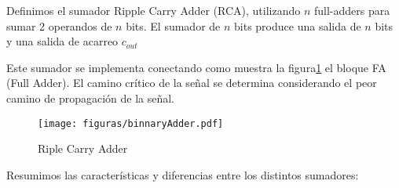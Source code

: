Definimos el sumador Ripple Carry Adder (RCA), utilizando \(n\) full-adders para sumar 2 operandos de \(n\) bits. El sumador de \(n\) bits produce una salida de \(n\) bits y una salida de acarreo \(c_{out}\)

Este sumador se implementa conectando como muestra la figura\ref{RCA} el bloque FA (Full Adder). El camino crítico de la señal se determina considerando el peor camino de propagación de la señal.  

\begin{figure}[h]
  \centering
{\label{RCA}\texttt{[image: figuras/binnaryAdder.pdf]}}
  \caption{Riple Carry Adder}
\vspace{-10pt}
\end{figure}

Resumimos las características y diferencias entre los distintos sumadores\cite{6120598}:
 


